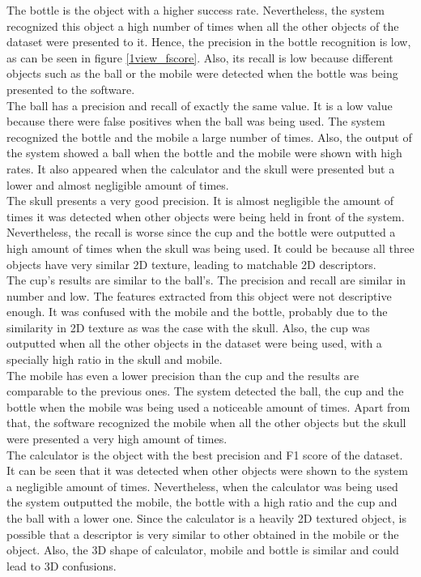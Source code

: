 	The bottle is the object with a higher success rate. 
	Nevertheless, the system recognized this object a high number of times when all the other objects of the dataset were presented to it. 
	Hence, the precision in the bottle recognition is low, as can be seen in figure \ref{1view_fscore}.
	Also, its recall is low because different objects such as the ball or the mobile were detected when the bottle was being presented to the software.  
	\\

	The ball has a precision and recall of exactly the same value. 
	It is a low value because there were false positives when the ball was being used. 
	The system recognized the bottle and the mobile a large number of times. 
	Also, the output of the system showed a ball when the bottle and the mobile were shown with high rates. 
	It also appeared when the calculator and the skull were presented but a lower and almost negligible amount of times. 
	\\

	The skull presents a very good precision. 
	It is almost negligible the amount of times it was detected when other objects were being held in front of the system. 
	Nevertheless, the recall is worse since the cup and the bottle were outputted a high amount of times when the skull was being used. 
	It could be because all three objects have very similar 2D texture, leading to matchable 2D descriptors. 
	\\

	The cup's results are similar to the ball's. 
	The precision and recall are similar in number and low. 
	The features extracted from this object were not descriptive enough.
	It was confused with the mobile and the bottle, probably due to the similarity in 2D texture as was the case with the skull. 
	Also, the cup was outputted when all the other objects in the dataset were being used, with a specially high ratio in the skull and mobile. 
	\\

	The mobile has even a lower precision than the cup and the results are comparable to the previous ones. 
	The system detected the ball, the cup and the bottle when the mobile was being used a noticeable amount of times.
	Apart from that, the software recognized the mobile when all the other objects but the skull were presented a very high amount of times. 
	\\

	The calculator is the object with the best precision and F1 score of the dataset. 
	It can be seen that it was detected when other objects were shown to the system a negligible amount of times. 
	Nevertheless, when the calculator was being used the system outputted the mobile, the bottle with a high ratio and the cup and the ball with a lower one.
	Since the calculator is a heavily 2D textured object, is possible that a descriptor is very similar to other obtained in the mobile or the object. 
	Also, the 3D shape of calculator, mobile and bottle is similar and could lead to 3D confusions.  


